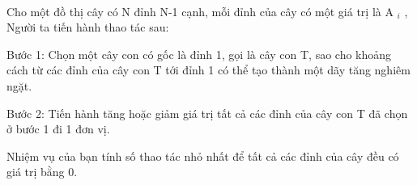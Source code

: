  

Cho một đồ thị cây có N đỉnh N-1 cạnh, mỗi đỉnh của cây có một giá trị là A $_ i $ , Người ta tiến hành thao tác sau:

Bước 1: Chọn một cây con có gốc là đỉnh 1, gọi là cây con T, sao cho khoảng cách từ các đỉnh của cây con T tới đỉnh 1 có thể tạo thành một dãy tăng nghiêm ngặt.

Bước 2: Tiến hành tăng hoặc giảm giá trị tất cả các đỉnh của cây con T đã chọn ở bước 1 đi 1 đơn vị.

Nhiệm vụ của bạn tính số thao tác nhỏ nhất để tất cả các đỉnh của cây đều có giá trị bằng 0.